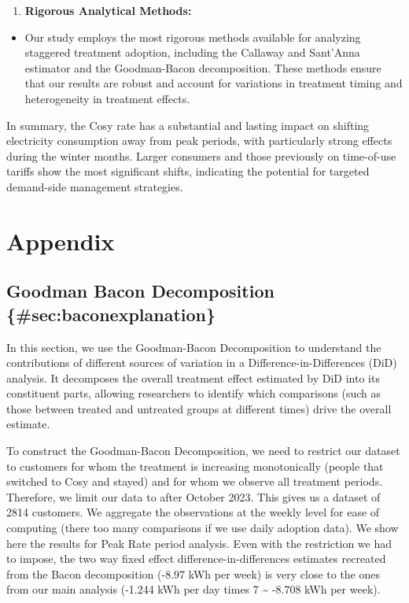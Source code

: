 \documentclass[
]{article}
\providecommand{\tightlist}{%
  \setlength{\itemsep}{0pt}\setlength{\parskip}{0pt}}
\begin{document}
\begin{enumerate}
\def\labelenumi{\arabic{enumi}.}
\setcounter{enumi}{5}
\tightlist
\item
  \textbf{Rigorous Analytical Methods:}
\end{enumerate}

\begin{itemize}
\tightlist
\item
  Our study employs the most rigorous methods available for analyzing staggered treatment adoption, including the Callaway and Sant'Anna estimator and the Goodman-Bacon decomposition. These methods ensure that our results are robust and account for variations in treatment timing and heterogeneity in treatment effects.
\end{itemize}

In summary, the Cosy rate has a substantial and lasting impact on shifting electricity consumption away from peak periods, with particularly strong effects during the winter months. Larger consumers and those previously on time-of-use tariffs show the most significant shifts, indicating the potential for targeted demand-side management strategies.

\appendix
\section*{Appendix}
\renewcommand{\thesubsection}{\Alph{subsection}}

\subsection*{Goodman Bacon Decomposition \{\#sec:baconexplanation\}}\label{goodman-bacon-decomposition-secbaconexplanation}

In this section, we use the Goodman-Bacon Decomposition to understand the contributions of different sources of variation in a Difference-in-Differences (DiD) analysis. It decomposes the overall treatment effect estimated by DiD into its constituent parts, allowing researchers to identify which comparisons (such as those between treated and untreated groups at different times) drive the overall estimate.

To construct the Goodman-Bacon Decomposition, we need to restrict our dataset to customers for whom the treatment is increasing monotonically (people that switched to Cosy and stayed) and for whom we observe all treatment periods. Therefore, we limit our data to after October 2023. This gives us a dataset of 2814 customers. We aggregate the observations at the weekly level for ease of computing (there too many comparisons if we use daily adoption data). We show here the results for Peak Rate period analysis.
Even with the restriction we had to impose, the two way fixed effect difference-in-differences estimates recreated from the Bacon decomposition (-8.97 kWh per week) is very close to the ones from our main analysis (-1.244 kWh per day times 7 \textasciitilde{} -8.708 kWh per week).
\end{document}
